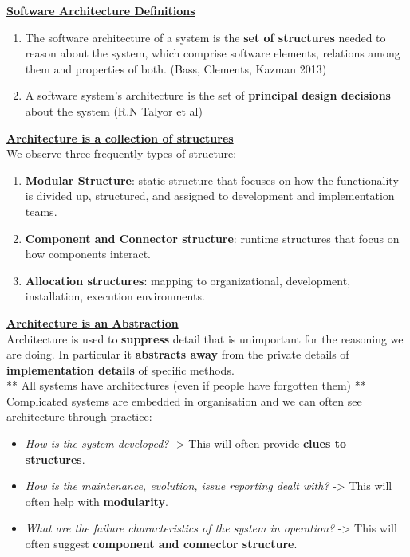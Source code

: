 \documentclass[a4paper]{report}
\begin{document}
\underline{\textbf{Software Architecture Definitions}}
\begin{enumerate}
\item The software architecture of a system is the \textbf{set of structures} needed to reason about the system, which comprise software elements, relations among them and properties of both. (Bass, Clements, Kazman 2013)
\item A software system's architecture is the set of \textbf{principal design decisions} about the system (R.N Talyor et al)\\
\end{enumerate}

\underline{\textbf{Architecture is a collection of structures}}\\
We observe three frequently types of structure:
\begin{enumerate}
\item \textbf{Modular Structure}: static structure that focuses on how the functionality is divided up, structured, and assigned to development and implementation teams.
\item \textbf{Component and Connector structure}: runtime structures that focus on how components interact.
\item \textbf{Allocation structures}: mapping to organizational, development, installation, execution environments.\\
\end{enumerate}

\underline{\textbf{Architecture is an Abstraction}}\\

Architecture is used to \textbf{suppress} detail that is unimportant for the reasoning we are doing. In particular it \textbf{abstracts away} from the private details of \textbf{implementation details} of specific methods.\\

** All systems have architectures (even if people have forgotten them) **\\

Complicated systems are embedded in organisation and we can often see architecture through practice:
\begin{itemize}
\item \textit{How is the system developed?} -> This will often provide \textbf{clues to structures}.
\item \textit{How is the maintenance, evolution, issue reporting dealt with?} -> This will often help with \textbf{modularity}.
\item \textit{What are the failure characteristics of the system in operation?} -> This will often suggest \textbf{component and connector structure}.
\end{itemize}
\end{document}
